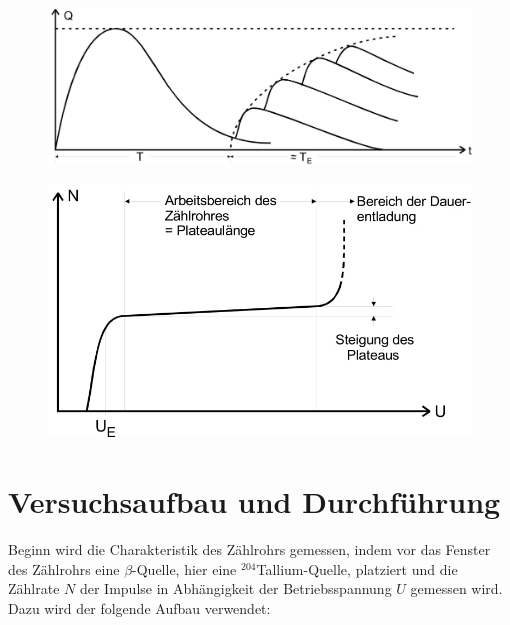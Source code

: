     \begin{figure}[H]
        \centering
        \includegraphics[width=\linewidth]{images/Erholungszeit.jpg}
        \caption{\cite{703}}
        \label{fig:2}
    \end{figure}

    \begin{figure}[H]
        \centering
        \includegraphics[width=\linewidth]{images/Plateau.jpg}
        \caption{\cite{703}}
        \label{fig:3}
    \end{figure}

\section{Versuchsaufbau und Durchführung}

    \justifying Beginn wird die Charakteristik des Zählrohrs gemessen, indem vor das Fenster des Zählrohrs eine $\beta$-Quelle,
    hier eine $^{204}$Tallium-Quelle, platziert und die Zählrate $N$ der Impulse in Abhängigkeit der Betriebsspannung $U$ gemessen wird. Dazu 
    wird der folgende Aufbau verwendet:

